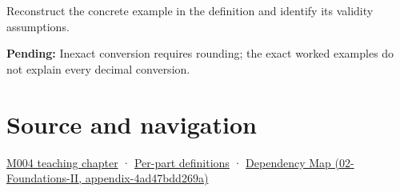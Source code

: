 Reconstruct the concrete example in the definition and identify its validity assumptions.

\textbf{Pending:} Inexact conversion requires rounding; the exact worked examples do not explain every decimal conversion.

\section{Source and navigation}\label{appendix-6854d0e2218e-source-and-navigation}

\href{Continuous\%20Notes/Computing\%20Foundations\%20-\%20From\%20Bits\%20to\%20C++\%20and\%20Systems\%20APIs\#A\%20stretching\%20ruler\%20for\%20real-valued\%20quantities}{M004 teaching chapter} · \hyperref[appendix-fd090d982a15-m004---parts-61-76]{Per-part definitions} · \href{../02-Foundations-II/main.pdf\#nameddest=appendix-4ad47bdd269a}{Dependency Map (02-Foundations-II, appendix-4ad47bdd269a)}
